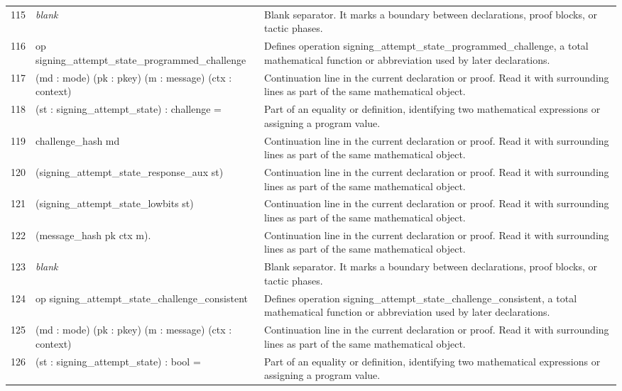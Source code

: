 \documentclass[10pt]{article}
\begin{document}
\begin{longtable}{r L{0.53\textwidth} L{0.37\textwidth}}
115 & {\ttfamily\scriptsize \emph{blank}} & Blank separator.  It marks a boundary between declarations, proof blocks, or tactic phases. \\
116 & {\ttfamily\scriptsize op signing\_attempt\_state\_programmed\_challenge} & Defines operation signing\_attempt\_state\_programmed\_challenge, a total mathematical function or abbreviation used by later declarations. \\
117 & {\ttfamily\scriptsize    (md : mode) (pk : pkey) (m : message) (ctx : context)} & Continuation line in the current declaration or proof.  Read it with surrounding lines as part of the same mathematical object. \\
118 & {\ttfamily\scriptsize    (st : signing\_attempt\_state) : challenge =} & Part of an equality or definition, identifying two mathematical expressions or assigning a program value. \\
119 & {\ttfamily\scriptsize   challenge\_hash md} & Continuation line in the current declaration or proof.  Read it with surrounding lines as part of the same mathematical object. \\
120 & {\ttfamily\scriptsize     (signing\_attempt\_state\_response\_aux st)} & Continuation line in the current declaration or proof.  Read it with surrounding lines as part of the same mathematical object. \\
121 & {\ttfamily\scriptsize     (signing\_attempt\_state\_lowbits st)} & Continuation line in the current declaration or proof.  Read it with surrounding lines as part of the same mathematical object. \\
122 & {\ttfamily\scriptsize     (message\_hash pk ctx m).} & Continuation line in the current declaration or proof.  Read it with surrounding lines as part of the same mathematical object. \\
123 & {\ttfamily\scriptsize \emph{blank}} & Blank separator.  It marks a boundary between declarations, proof blocks, or tactic phases. \\
124 & {\ttfamily\scriptsize op signing\_attempt\_state\_challenge\_consistent} & Defines operation signing\_attempt\_state\_challenge\_consistent, a total mathematical function or abbreviation used by later declarations. \\
125 & {\ttfamily\scriptsize    (md : mode) (pk : pkey) (m : message) (ctx : context)} & Continuation line in the current declaration or proof.  Read it with surrounding lines as part of the same mathematical object. \\
126 & {\ttfamily\scriptsize    (st : signing\_attempt\_state) : bool =} & Part of an equality or definition, identifying two mathematical expressions or assigning a program value. \\

\end{longtable}
\end{document}
